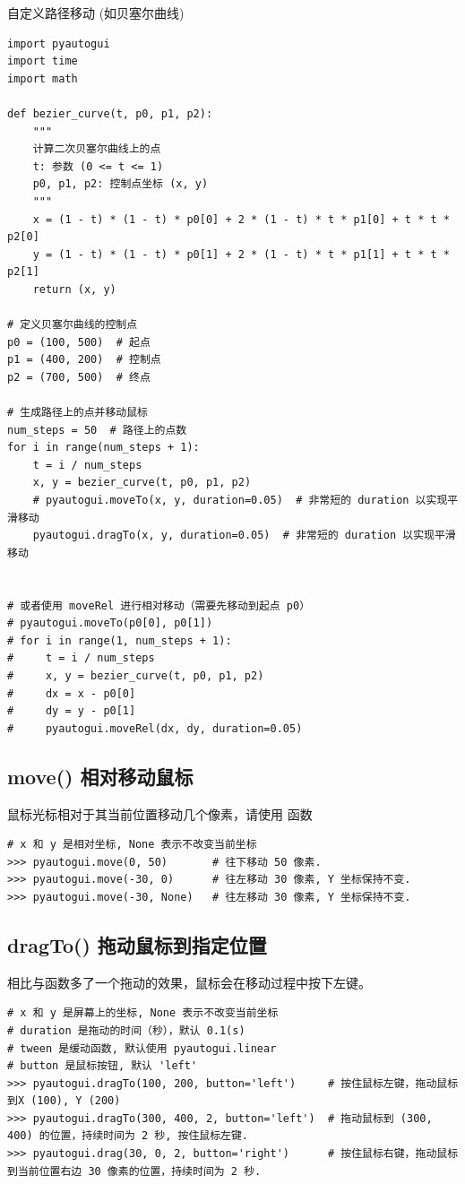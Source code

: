 自定义路径移动 (如贝塞尔曲线)
\begin{lstlisting}[style=pythonstyle, title={自定义路径移动.py}]
import pyautogui
import time
import math
 
def bezier_curve(t, p0, p1, p2):
    """
    计算二次贝塞尔曲线上的点
    t: 参数 (0 <= t <= 1)
    p0, p1, p2: 控制点坐标 (x, y)
    """
    x = (1 - t) * (1 - t) * p0[0] + 2 * (1 - t) * t * p1[0] + t * t * p2[0]
    y = (1 - t) * (1 - t) * p0[1] + 2 * (1 - t) * t * p1[1] + t * t * p2[1]
    return (x, y)
 
# 定义贝塞尔曲线的控制点
p0 = (100, 500)  # 起点
p1 = (400, 200)  # 控制点
p2 = (700, 500)  # 终点
 
# 生成路径上的点并移动鼠标
num_steps = 50  # 路径上的点数
for i in range(num_steps + 1):
    t = i / num_steps
    x, y = bezier_curve(t, p0, p1, p2)
    # pyautogui.moveTo(x, y, duration=0.05)  # 非常短的 duration 以实现平滑移动
    pyautogui.dragTo(x, y, duration=0.05)  # 非常短的 duration 以实现平滑移动

 
# 或者使用 moveRel 进行相对移动（需要先移动到起点 p0）
# pyautogui.moveTo(p0[0], p0[1])
# for i in range(1, num_steps + 1):
#     t = i / num_steps
#     x, y = bezier_curve(t, p0, p1, p2)
#     dx = x - p0[0]
#     dy = y - p0[1]
#     pyautogui.moveRel(dx, dy, duration=0.05)
\end{lstlisting}

\subsection{move() 相对移动鼠标}
鼠标光标相对于其当前位置移动几个像素，请使用  函数
\begin{lstlisting}[style=demostyle,numbers=none]
# x 和 y 是相对坐标, None 表示不改变当前坐标
>>> pyautogui.move(0, 50)       # 往下移动 50 像素.
>>> pyautogui.move(-30, 0)      # 往左移动 30 像素, Y 坐标保持不变.
>>> pyautogui.move(-30, None)   # 往左移动 30 像素, Y 坐标保持不变.
\end{lstlisting}

\subsection{dragTo() 拖动鼠标到指定位置}
相比与函数多了一个拖动的效果，鼠标会在移动过程中按下左键。
\begin{lstlisting}[style=demostyle,numbers=none]
# x 和 y 是屏幕上的坐标, None 表示不改变当前坐标
# duration 是拖动的时间（秒），默认 0.1(s)
# tween 是缓动函数, 默认使用 pyautogui.linear
# button 是鼠标按钮, 默认 'left'
>>> pyautogui.dragTo(100, 200, button='left')     # 按住鼠标左键，拖动鼠标到X (100), Y (200)
>>> pyautogui.dragTo(300, 400, 2, button='left')  # 拖动鼠标到 (300, 400) 的位置，持续时间为 2 秒, 按住鼠标左键.
>>> pyautogui.drag(30, 0, 2, button='right')      # 按住鼠标右键，拖动鼠标到当前位置右边 30 像素的位置，持续时间为 2 秒.
\end{lstlisting}

